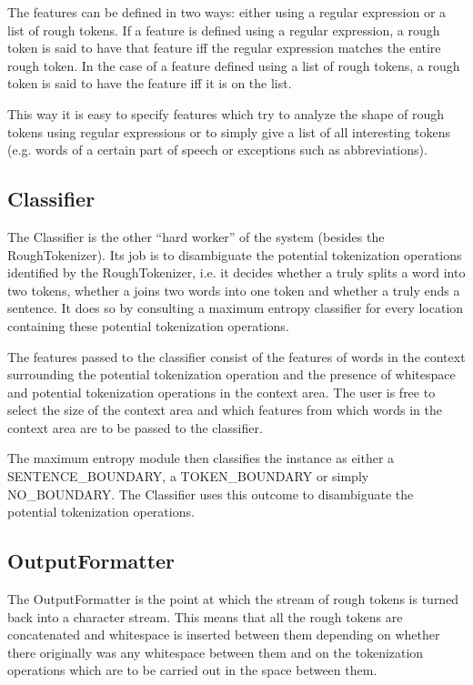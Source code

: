 The features can be defined in two ways: either using a regular
expression or a list of rough tokens. If a feature is defined using a
regular expression, a rough token is said to have that feature iff the
regular expression matches the entire rough token. In the case of a
feature defined using a list of rough tokens, a rough token is said to
have the feature iff it is on the list.

This way it is easy to specify features which try to analyze the shape
of rough tokens using regular expressions or to simply give a list of
all interesting tokens (e.g. words of a certain part of speech or
exceptions such as abbreviations).

\subsection{Classifier}

The Classifier is the other ``hard worker'' of the system (besides the
RoughTokenizer). Its job is to disambiguate the potential tokenization
operations identified by the RoughTokenizer, i.e. it decides whether a
\maysplit{} truly splits a word into two tokens, whether a \mayjoin{}
joins two words into one token and whether a \maybreaksentence{} truly
ends a sentence. It does so by consulting a maximum entropy classifier
for every location containing these potential tokenization operations.

The features passed to the classifier consist of the features of words
in the context surrounding the potential tokenization operation and
the presence of whitespace and potential tokenization operations in
the context area. The user is free to select the size of the context
area and which features from which words in the context area are to be
passed to the classifier.

The maximum entropy module then classifies the instance as either a
SENTENCE\_BOUNDARY, a TOKEN\_BOUNDARY or simply NO\_BOUNDARY. The
Classifier uses this outcome to disambiguate the potential
tokenization operations.

\subsection{OutputFormatter}

The OutputFormatter is the point at which the stream of rough tokens
is turned back into a character stream. This means that all the rough
tokens are concatenated and whitespace is inserted between them
depending on whether there originally was any whitespace between them
and on the tokenization operations which are to be carried out in the
space between them.

